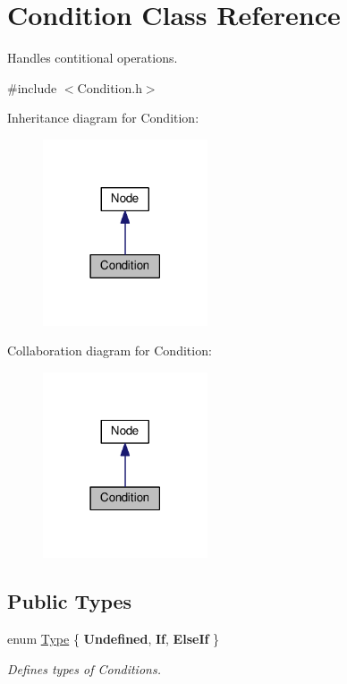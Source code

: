 \hypertarget{classCondition}{}\section{Condition Class Reference}
\label{classCondition}


Handles contitional operations.  




{\ttfamily \#include $<$Condition.\+h$>$}



Inheritance diagram for Condition\+:\nopagebreak
\begin{figure}[H]
\begin{center}
\leavevmode
\includegraphics[width=138pt]{classCondition__inherit__graph}
\end{center}
\end{figure}


Collaboration diagram for Condition\+:\nopagebreak
\begin{figure}[H]
\begin{center}
\leavevmode
\includegraphics[width=138pt]{classCondition__coll__graph}
\end{center}
\end{figure}
\subsection*{Public Types}
\begin{DoxyCompactItemize}
\item 
\hypertarget{classCondition_a3eed4b7ef94da5dda4a3353cffa8266e}{}enum \hyperlink{classCondition_a3eed4b7ef94da5dda4a3353cffa8266e}{Type} \{ {\bfseries Undefined}, 
{\bfseries If}, 
{\bfseries Else\+If}
 \}\label{classCondition_a3eed4b7ef94da5dda4a3353cffa8266e}

\begin{DoxyCompactList}\small\item\em Defines types of Conditions. \end{DoxyCompactList}\end{DoxyCompactItemize}
